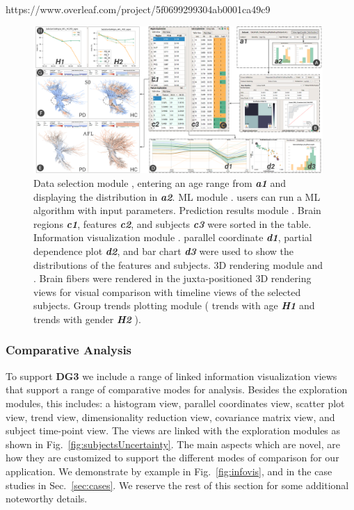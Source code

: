 https://www.overleaf.com/project/5f0699299304ab0001ca49c9
\begin{figure}[t!]
\centering
\includegraphics[width=0.98\textwidth]{images/SNSteps_v5.png}%
\caption{ Data selection module , entering an age range from \textbf{\textit{a1}} and displaying the distribution in \textbf{\textit{a2}}. ML module . users can run a ML algorithm with input parameters. Prediction results module . Brain regions \textbf{\textit{c1}}, features \textbf{\textit{c2}}, and subjects \textbf{\textit{c3}} were sorted in the table. Information visualization module . parallel coordinate \textbf{\textit{d1}}, partial dependence plot \textbf{\textit{d2}}, and bar chart \textbf{\textit{d3}} were used to show the distributions of the features and subjects. 3D rendering module  and . Brain fibers were rendered in the juxta-positioned 3D rendering views for visual comparison with timeline views   of the selected subjects. Group trends plotting module  ( trends with age \textbf{\textit{H1}} and trends with gender \textbf{\textit{H2}} ).}
\label{fig:SNSteps}
\end{figure}


\subsubsection{Comparative Analysis}
\label{sec:comparison}

\noindent To support \textbf{DG3} we include a range of linked information visualization views that support a range of comparative modes for analysis. Besides the exploration modules, this includes: a histogram view, parallel coordinates view, scatter plot view, trend view, dimensionality reduction view, covariance matrix view, and subject time-point view. The views are linked with the exploration modules as shown in Fig.~\ref{fig:subjectsUncertainty}. The main aspects which are novel, are how they are customized to support the different modes of comparison for our application. We demonstrate by example in Fig.~\ref{fig:infovis}, and in the case studies in Sec.~\ref{sec:cases}. We reserve the rest of this section for some additional noteworthy details.  

